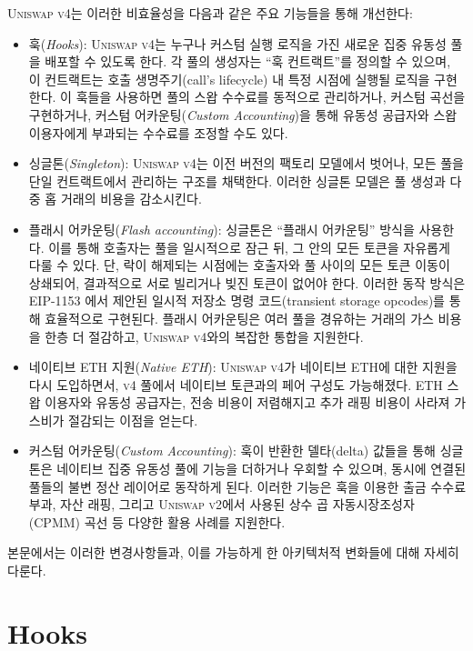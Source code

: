 \documentclass[sigconf,nonacm,prologue,table]{acmart}
\numberwithin{equation}{section}
\theoremstyle{definition}
\theoremstyle{remark}
\begin{document}
\textsc{Uniswap v4}는 이러한 비효율성을 다음과 같은 주요 기능들을 통해 개선한다:
\begin{itemize}
    \item 훅(\emph{Hooks}): \textsc{Uniswap v4}는 누구나 커스텀 실행 로직을 가진 새로운 집중 유동성 풀을 배포할 수 있도록 한다. 각 풀의 생성자는 “훅 컨트랙트”를 정의할 수 있으며, 이 컨트랙트는 호출 생명주기(call’s lifecycle) 내 특정 시점에 실행될 로직을 구현한다. 이 훅들을 사용하면 풀의 스왑 수수료를 동적으로 관리하거나, 커스텀 곡선을 구현하거나, 커스텀 어카운팅(\emph{Custom Accounting})을 통해 유동성 공급자와 스왑 이용자에게 부과되는 수수료를 조정할 수도 있다.
    \item 싱글톤(\emph{Singleton}): \textsc{Uniswap v4}는 이전 버전의 팩토리 모델에서 벗어나, 모든 풀을 단일 컨트랙트에서 관리하는 구조를 채택한다. 이러한 싱글톤 모델은 풀 생성과 다중 홉 거래의 비용을 감소시킨다.
    \item 플래시 어카운팅(\emph{Flash accounting}): 싱글톤은 “플래시 어카운팅” 방식을 사용한다. 이를 통해 호출자는 풀을 일시적으로 잠근 뒤, 그 안의 모든 토큰을 자유롭게 다룰 수 있다. 단, 락이 해제되는 시점에는 호출자와 풀 사이의 모든 토큰 이동이 상쇄되어, 결과적으로 서로 빌리거나 빚진 토큰이 없어야 한다. 이러한 동작 방식은 EIP-1153 \cite{Akhunov2018}에서 제안된 일시적 저장소 명령 코드(transient storage opcodes)를 통해 효율적으로 구현된다. 플래시 어카운팅은 여러 풀을 경유하는 거래의 가스 비용을 한층 더 절감하고, \textsc{Uniswap v4}와의 복잡한 통합을 지원한다.
    \item 네이티브 ETH 지원(\emph{Native ETH}): \textsc{Uniswap v4}가 네이티브 ETH에 대한 지원을 다시 도입하면서, \textsc{v4} 풀에서 네이티브 토큰과의 페어 구성도 가능해졌다.
ETH 스왑 이용자와 유동성 공급자는, 전송 비용이 저렴해지고 추가 래핑 비용이 사라져 가스비가 절감되는 이점을 얻는다.
   \item 커스텀 어카운팅(\emph{Custom Accounting}): 훅이 반환한 델타(delta) 값들을 통해 싱글톤은 네이티브 집중 유동성 풀에 기능을 더하거나 우회할 수 있으며, 동시에 연결된 풀들의 불변 정산 레이어로 동작하게 된다. 이러한 기능은 훅을 이용한 출금 수수료 부과, 자산 래핑, 그리고 \textsc{Uniswap v2}에서 사용된 상수 곱 자동시장조성자(CPMM) 곡선 등 다양한 활용 사례를 지원한다.
\end{itemize}

본문에서는 이러한 변경사항들과, 이를 가능하게 한 아키텍처적 변화들에 대해 자세히 다룬다.

\section{Hooks} 
\label{sec:Hooks}
\end{document}
